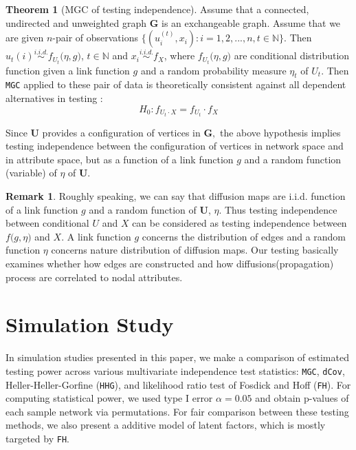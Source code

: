 \documentclass[12pt]{article}
\theoremstyle{definition}
\newtheorem{theorem}{Theorem}[section]
\newtheorem{remark}{Remark}
\begin{document}
\begin{theorem}[MGC of testing independence]
	\label{theorem1}
Assume that a connected, undirected and unweighted graph $\mathbf{G}$ is an exchangeable graph.  Assume that we are given $n$-pair of observations $\{ (u^{(t)}_{i}, x_{i}): i = 1,2,... , n  , t \in \mathbb{N} \}$. Then $u_{t}(i) \overset{i.i.d.}{\sim} f_{U_t} \big(  \eta, g \big)$, $t \in \mathbb{N}$ and $x_{i} \overset{i.i.d.}{\sim} f_{X}$, where $f_{U_t} \big( \eta, g \big)$ are conditional distribution function given a link function $g$ and a random probability measure $\eta_{t}$ of $U_t$. Then \texttt{MGC} applied to these pair of data is theoretically consistent against all dependent alternatives in testing :
$$H_{0} : f_{U_t \cdot X} = f_{U_t} \cdot f_{X}$$
\end{theorem}


Since $\boldsymbol{U}$ provides a configuration of vertices in $\boldsymbol{G},$ the above hypothesis implies testing independence between the configuration of vertices in network space and in attribute space, but as a function of a link function $g$ and a random function (variable) of $\eta$ of $\mathbf{U}$.


\begin{remark}
Roughly speaking, we can say that diffusion maps are i.i.d. function of a link function $g$ and a random function of $\mathbf{U}$, $\eta$. Thus testing independence between conditional $U$ and $X$ can be considered as testing independence between $f \big( g, \eta \big)$ and $X$. A link function $g$ concerns the distribution of edges and a random function $\eta$ concerns nature distribution of diffusion maps. Our testing basically examines whether how edges are constructed and how diffusions(propagation) process are correlated to nodal attributes.  
\end{remark}

\newpage
\section{Simulation Study}
\label{sec:sim}

In simulation studies presented in this paper, we make a comparison of estimated testing power across various multivariate independence test statistics: \texttt{MGC}, \texttt{dCov}, Heller-Heller-Gorfine (\texttt{HHG})\cite{HHG}, and likelihood ratio test of Fosdick and Hoff (\texttt{FH}). For computing statistical power, we used type I error $\alpha = 0.05$ and obtain p-values of each sample network via permutations. For fair comparison between these testing methods, we also present a additive model of latent factors, which is mostly targeted by \texttt{FH}.   
\end{document}
